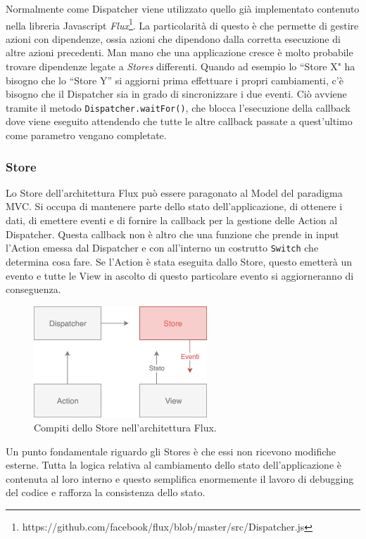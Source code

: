 Normalmente come Dispatcher viene utilizzato quello già implementato contenuto nella libreria Javascript \textit{Flux}\footnote{https://github.com/facebook/flux/blob/master/src/Dispatcher.js}. La particolarità di questo è che permette di gestire azioni con dipendenze, ossia azioni che dipendono dalla corretta esecuzione di altre azioni precedenti. Man mano che una applicazione cresce è molto probabile trovare dipendenze legate a \textit{Stores} differenti. Quando ad esempio lo “Store X" ha bisogno che lo “Store Y” si aggiorni prima effettuare i propri cambiamenti, c'è bisogno che il Dispatcher sia in grado di sincronizzare i due eventi. Ciò avviene tramite il metodo \texttt{Dispatcher.waitFor()}, che blocca l'esecuzione della callback dove viene eseguito attendendo che tutte le altre callback passate a quest'ultimo come parametro vengano completate.

\subsubsection*{Store}
Lo Store dell'architettura Flux può essere paragonato al Model del paradigma MVC. Si occupa di mantenere parte dello stato dell'applicazione, di ottenere i dati, di emettere eventi e di fornire la callback per la gestione delle Action al Dispatcher. Questa callback non è altro che una funzione che prende in input l'Action emessa dal Dispatcher e con all'interno un costrutto \texttt{Switch} che determina cosa fare. Se l'Action è stata eseguita dallo Store, questo emetterà un evento e tutte le View in ascolto di questo particolare evento si aggiorneranno di conseguenza.

\begin{figure}[h]
\centering
\vspace*{0.5cm} 
\includegraphics[width=6.5cm]{./images/StoreWorkflow}
\caption{Compiti dello Store nell'architettura Flux.}
\label{StoreWorkflow}
\vspace*{0.5cm} 
\end{figure}

Un punto fondamentale riguardo gli Stores è che essi non ricevono modifiche esterne. Tutta la logica relativa al cambiamento dello stato dell'applicazione è contenuta al loro interno e questo semplifica enormemente il lavoro di debugging del codice e rafforza la consistenza dello stato.

